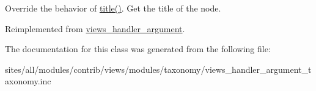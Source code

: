 Override the behavior of \hyperlink{classviews__handler__argument__taxonomy_330517e71ccc84fe85e871e05640c36d}{title()}. Get the title of the node. 

Reimplemented from \hyperlink{classviews__handler__argument_76181ac24e7be4a09aaafc1fa5f15ea1}{views\_\-handler\_\-argument}.

The documentation for this class was generated from the following file:\begin{CompactItemize}
\item 
sites/all/modules/contrib/views/modules/taxonomy/views\_\-handler\_\-argument\_\-taxonomy.inc\end{CompactItemize}

